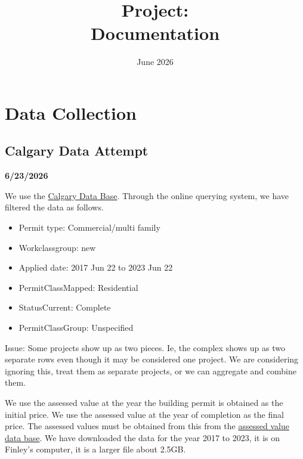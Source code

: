 \documentclass{article}
\title{\bf{Project:\\ Documentation}}
\date{June 2026}
\begin{document}
\maketitle

\section*{Data Collection}

    \subsection*{Calgary Data Attempt}

         \begin{flushleft}
            \textbf{6/23/2026}
        \end{flushleft}
    
        We use the \href{https://data.calgary.ca/Business-and-Economic-Activity/Building-Permits/c2es-76ed/about_data}{Calgary Data Base}. Through the online querying system, we have filtered the data as follows.

        \begin{itemize}
            \item Permit type: Commercial/multi family
            \item Workclassgroup: new
            \item Applied date: 2017 Jun 22 to 2023 Jun 22
            \item PermitClassMapped: Residential
            \item StatusCurrent: Complete
            \item PermitClassGroup: Unspecified
        \end{itemize}
        
        Issue: Some projects show up as two pieces. Ie, the complex shows up as two separate rows even though it may be considered one project. We are considering ignoring this, treat them as separate projects, or we can aggregate and combine them. 
        
        We use the assessed value at the year the building permit is obtained as the initial price. We use the assessed value at the year of completion as the final price. The assessed values must be obtained from this from the \href{https://data.calgary.ca/Government/Total-Property-Assessed-Value/dmd8-bmxh}{assessed value data base}. We have downloaded the data for the year 2017 to 2023, it is on Finley's computer, it is a larger file about 2.5GB.
\end{document}
